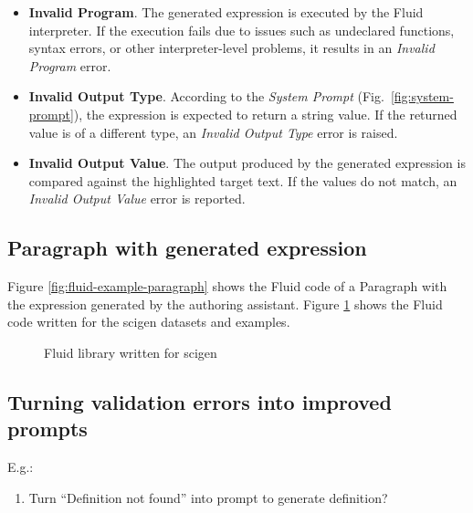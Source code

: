 \begin{itemize}
    \item \textbf{Invalid Program}.
    The generated expression is executed by the Fluid interpreter.
    If the execution fails due to issues such as undeclared functions, syntax errors, or other interpreter-level problems, it results in an \textit{Invalid Program} error.
    \item \textbf{Invalid Output Type}.
    According to the \textit{System Prompt} (Fig.~\ref{fig:system-prompt}), the expression is expected to return a string value.
    If the returned value is of a different type, an \textit{Invalid Output Type} error is raised.
    \item \textbf{Invalid Output Value}.
    The output produced by the generated expression is compared against the highlighted target text.
    If the values do not match, an \textit{Invalid Output Value} error is reported.
\end{itemize}

\subsection{Paragraph with generated expression}
\label{subsec:paragraph-with-generated-expression}
Figure \ref{fig:fluid-example-paragraph} shows the Fluid code of a Paragraph with the expression generated by the authoring assistant.
Figure \ref{fig:fluid-scigen} shows the Fluid code written for the scigen datasets and examples.

\begin{figure}[h]
    \small
    {}
    \caption{Fluid library written for scigen}
    \label{fig:fluid-scigen}
\end{figure}

\subsection{Turning validation errors into improved prompts}\label{subsec:turning-validation-errors-into-improved-prompts}
E.g.:
\begin{enumerate}
\item Turn ``Definition not found'' into prompt to generate definition?
\end{enumerate}

